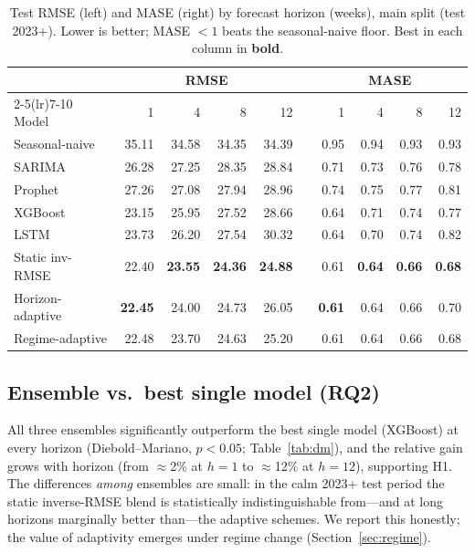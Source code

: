 \documentclass[11pt]{article}
\begin{document}
\begin{table}[t]\centering
\caption{Test RMSE (left) and MASE (right) by forecast horizon (weeks), main split (test 2023+).
Lower is better; MASE $<1$ beats the seasonal-naive floor. Best in each column in \textbf{bold}.}
\label{tab:metrics}
\small
\begin{tabular}{l rrrr c rrrr}
\toprule
 & \multicolumn{4}{c}{RMSE} & & \multicolumn{4}{c}{MASE}\\
\cmidrule(lr){2-5}\cmidrule(lr){7-10}
Model & 1 & 4 & 8 & 12 & & 1 & 4 & 8 & 12\\
\midrule
Seasonal-naive      & 35.11 & 34.58 & 34.35 & 34.39 & & 0.95 & 0.94 & 0.93 & 0.93\\
SARIMA              & 26.28 & 27.25 & 28.35 & 28.84 & & 0.71 & 0.73 & 0.76 & 0.78\\
Prophet             & 27.26 & 27.08 & 27.94 & 28.96 & & 0.74 & 0.75 & 0.77 & 0.81\\
XGBoost             & 23.15 & 25.95 & 27.52 & 28.66 & & 0.64 & 0.71 & 0.74 & 0.77\\
LSTM                & 23.73 & 26.20 & 27.54 & 30.32 & & 0.64 & 0.70 & 0.74 & 0.82\\
\midrule
Static inv-RMSE     & 22.40 & \textbf{23.55} & \textbf{24.36} & \textbf{24.88} & & 0.61 & \textbf{0.64} & \textbf{0.66} & \textbf{0.68}\\
Horizon-adaptive    & \textbf{22.45} & 24.00 & 24.73 & 26.05 & & \textbf{0.61} & 0.64 & 0.66 & 0.70\\
Regime-adaptive     & 22.48 & 23.70 & 24.63 & 25.20 & & 0.61 & 0.64 & 0.66 & 0.68\\
\bottomrule
\end{tabular}
\end{table}

\subsection{Ensemble vs.\ best single model (RQ2)}
All three ensembles significantly outperform the best single model (XGBoost) at every horizon
(Diebold--Mariano, $p<0.05$; Table~\ref{tab:dm}), and the relative gain grows with horizon (from
$\approx$2\% at $h{=}1$ to $\approx$12\% at $h{=}12$), supporting H1. The differences \emph{among}
ensembles are small: in the calm 2023+ test period the static inverse-RMSE blend is statistically
indistinguishable from---and at long horizons marginally better than---the adaptive schemes. We report
this honestly; the value of adaptivity emerges under regime change (Section~\ref{sec:regime}).
\end{document}
